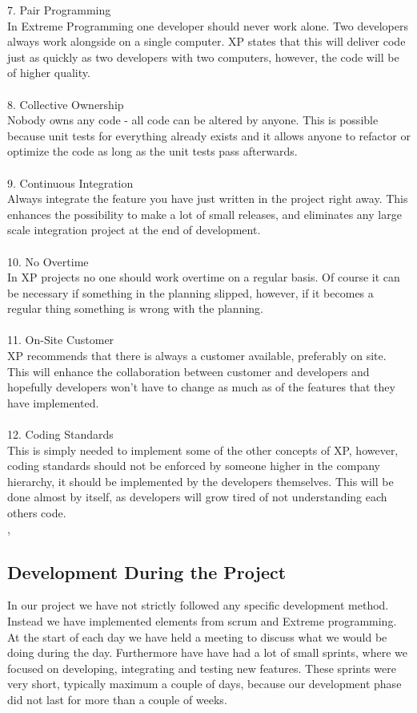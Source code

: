 7. Pair Programming\\
In Extreme Programming one developer should never work alone. Two developers always work alongside on a single computer. XP states that this will deliver code just as quickly as two developers with two computers, however, the code will be of higher quality.\\
 \\
8. Collective Ownership\\
Nobody owns any code - all code can be altered by anyone. This is possible because unit tests for everything already exists and it allows anyone to refactor or optimize the code as long as the unit tests pass afterwards.\\
 \\
9. Continuous Integration\\
Always integrate the feature you have just written in the project right away. This enhances the possibility to make a lot of small releases, and eliminates any large scale integration project at the end of development.\\
 \\
10. No Overtime\\
In XP projects no one should work overtime on a regular basis. Of course it can be necessary if something in the planning slipped, however, if it becomes a regular thing something is wrong with the planning.\\
 \\
11. On-Site Customer\\
XP recommends that there is always a customer available, preferably on site. This will enhance the collaboration between customer and developers and hopefully developers won't have to change as much as of the features that they have implemented.\\
 \\
12. Coding Standards\\
This is simply needed to implement some of the other concepts of XP, however, coding standards should not be enforced by someone higher in the company hierarchy, it should be implemented by the developers themselves. This will be done almost by itself, as developers will grow tired of not understanding each others code. \\

\cite{xp}, \cite{xp2}
\subsection{Development During the Project}
\label{sub:ourDevMethod}
In our project we have not strictly followed any specific development method. Instead we have implemented elements from scrum and Extreme programming. At the start of each day we have held a meeting to discuss what we would be doing during the day. Furthermore have have had a lot of small sprints, where we focused on developing, integrating and testing new features. These sprints were very short, typically maximum a couple of days, because our development phase did not last for more than a couple of weeks.

